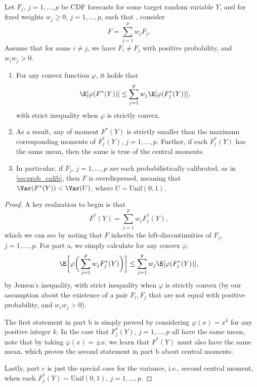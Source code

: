 \documentclass{article}
\begin{document}
\begin{theorem}
\label{thm:prob_prob}
Let $F_j$, $j=1,\dots,p$ be CDF forecasts for some target random variable $Y$,
and for fixed weights $w_j \geq 0$, $j=1,\dots,p$, such that
, consider  
\[
F = \sum_{j=1}^p w_j F_j.
\]
Assume that for some $i \not= j$, we have $F_i \not= F_j$ with positive 
probability, and $w_iw_j > 0$. 

\begin{enumerate}[label=\alph*.]
\item For any convex function $\varphi$, it holds that
\[
\E[\varphi(F^*(Y))] \leq \sum_{j=1}^p w_j \E[\varphi(F_j^*(Y))], 
\]
with strict inequality when $\varphi$ is strictly convex.

\item As a result, any of moment $F^*(Y)$ is strictly smaller than the maximum
  corresponding moments of $F_j^*(Y)$, $j=1,\dots,p$. Further, if each
  $F_j^*(Y)$ has the same mean, then the same is true of the central moments.         

\item In particular, if $F_j$, $j=1,\dots,p$ are each probabilistically
  calibrated, as in \eqref{eq:prob_calib}, then $F$ is overdispersed, meaning
  that $\Var(F^*(Y)) < \Var(U)$, where $U \sim \mathrm{Unif}(0,1)$.  
\end{enumerate}
\end{theorem}

\begin{proof}
A key realization to begin is that
\[
F^*(Y) = \sum_{j=1}^p w_j F_j^*(Y),
\]
which we can see by noting that $F$ inherits the left-discontinuities of $F_j$,
$j=1,\dots,p$. For part a, we simply calculate for any convex $\varphi$,  
\[
\E\bigg[\varphi\bigg( \sum_{j=1}^p w_j F_j^*(Y) \bigg)\bigg] \leq 
\sum_{j=1}^p w_j \E[\varphi(F_j^*(Y))],
\]
by Jensen's inequality, with strict inequality when $\varphi$ is strictly 
convex (by our assumption about the existence of a pair $F_i,F_j$ that are 
not equal with positive probability, and $w_iw_j>0$).

The first statement in part b is simply proved by considering $\varphi(x) = x^k$
for any positive integer $k$. In the case that $F_j^*(Y)$, $j=1,\dots,p$ all
have the same mean, note that by taking $\varphi(x) = \pm x$, we learn that
$F^*(Y)$ must also have the same mean, which proves the second statement in part
b about central moments.

Lastly, part c is just the special case for the variance, i.e., second central
moment, when each $F_j^*(Y) \sim \mathrm{Unif}(0,1)$, $j=1,\dots,p$.
\end{proof}
\end{document}
